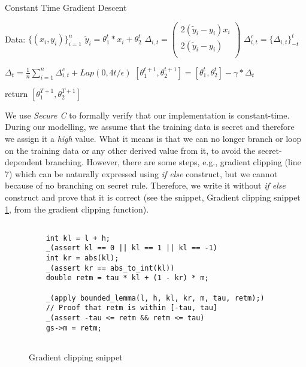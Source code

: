 \documentclass[sigplan,screen]{acmart}
\begin{document}
\begin{algorithm}
  \caption{Constant Time Gradient Descent}\label{constant-time}
  \begin{algorithmic}[1]
     
    \State Data: $\{(x_{i}, y_{i})\}_{i=1}^n$
            \State $\tilde{y}_{i} =  \theta_{1}^{t} * x_{i} + \theta_{2}^{t}$
            \State $\Delta_{i, t} = \begin{pmatrix} 
                                    2(\tilde{y}_{i} - y_{i}) x_{i} \\
                                    2(\tilde{y}_{i} - y_{i})\\
                                    \end{pmatrix}$
            \State $\Delta_{i, t}^{c} = \{\Delta_{i, t}\}_{-t}^{t}$ 
            
        \EndFor
        
        \State $\Delta_{t}  = \frac{1}{n}\sum_{i=1}^{n} \Delta_{i, t}^{c} + Lap(0, 4 t / \epsilon)$
        \State $[\theta_{1}^{t+1}, \theta_{2}^{t+1}] = [\theta_{1}^{t}, \theta_{2}^{t}] - \gamma * \Delta_{t}$ 
    
    \EndFor
    
    \State return $[\theta_{1}^{T+1}, \theta_{2}^{T+1}]$
    
  
    \EndProcedure
  \end{algorithmic}
\end{algorithm}

 \noindent
 We use \textit{Secure C} \cite{10.1007/978-3-030-25543-5_13} to formally verify 
 that our implementation is constant-time. During our modelling, we assume that the training data is 
 secret and therefore we assign it a \textit{high} value. What it means is that we can 
 no longer branch or loop on the training data or any other derived value from it, to
 avoid the secret-dependent branching. However, there are some steps, e.g., gradient clipping
 (line 7) which can be naturally expressed using \textit{if else } construct, but we cannot
 because of no branching on secret rule. Therefore, we write it without \textit{if else } construct
 and prove that it is correct (see the snippet, Gradient clipping snippet \ref{grad-clip}, from the gradient clipping function).
\begin{figure}[h!]
\begin{verbatim}
    
    int kl = l + h;
    _(assert kl == 0 || kl == 1 || kl == -1)
    int kr = abs(kl);
    _(assert kr == abs_to_int(kl))
    double retm = tau * kl + (1 - kr) * m;
  
    _(apply bounded_lemma(l, h, kl, kr, m, tau, retm);)
    // Proof that retm is within [-tau, tau]
    _(assert -tau <= retm && retm <= tau)
    gs->m = retm;
    
\end{verbatim}\caption{Gradient clipping snippet}\label{grad-clip}
\end{figure}
\end{document}
